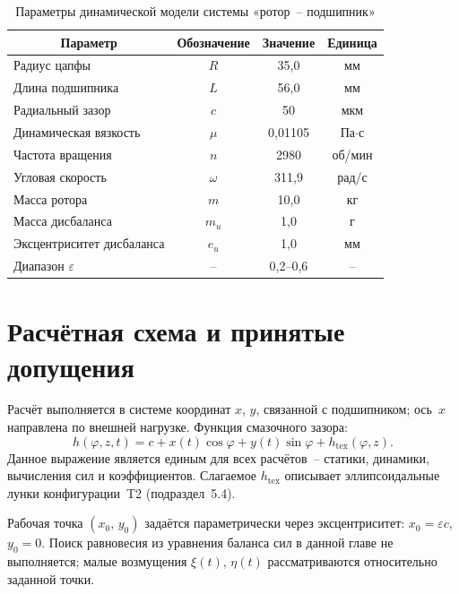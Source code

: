 \begin{table}[!ht]
\centering
\caption{Параметры динамической модели системы «ротор~-- подшипник»}
\label{tab:dyn_params}
\begin{tabularx}{\textwidth}{|X|c|c|c|}
\hline
\multicolumn{1}{|c|}{\textbf{Параметр}} & \textbf{Обозначение} & \textbf{Значение} & \textbf{Единица} \\
\hline
Радиус цапфы            & $R$        & 35{,}0   & мм \\
\hline
Длина подшипника        & $L$        & 56{,}0   & мм \\
\hline
Радиальный зазор        & $c$        & 50       & мкм \\
\hline
Динамическая вязкость   & $\mu$      & 0{,}01105 & Па$\cdot$с \\
\hline
Частота вращения        & $n$        & 2980     & об/мин \\
\hline
Угловая скорость        & $\omega$   & 311{,}9  & рад/с \\
\hline
Масса ротора            & $m$        & 10{,}0   & кг \\
\hline
Масса дисбаланса        & $m_u$      & 1{,}0    & г \\
\hline
Эксцентриситет дисбаланса & $e_u$    & 1{,}0    & мм \\
\hline
Диапазон $\varepsilon$  & --         & 0{,}2--0{,}6 & -- \\
\hline
\end{tabularx}
\end{table}


\section{Расчётная схема и принятые допущения}

Расчёт выполняется в системе координат $x$, $y$, связанной
с подшипником; ось~$x$ направлена по внешней нагрузке. Функция
смазочного зазора:
\begin{equation}
  h(\varphi, z, t) = c + x(t)\cos\varphi + y(t)\sin\varphi
    + h_{\mathrm{tex}}(\varphi, z).
  \label{eq:dyn_h}
\end{equation}
Данное выражение является единым для всех расчётов~-- статики,
динамики, вычисления сил и коэффициентов. Слагаемое
$h_{\mathrm{tex}}$ описывает эллипсоидальные лунки
конфигурации~T2 (подраздел~5.4).

Рабочая точка $(x_0,\, y_0)$ задаётся параметрически через
эксцентриситет: $x_0 = \varepsilon c$, $y_0 = 0$. Поиск
равновесия из уравнения баланса сил в данной главе не
выполняется; малые возмущения $\xi(t)$, $\eta(t)$
рассматриваются относительно заданной точки.

